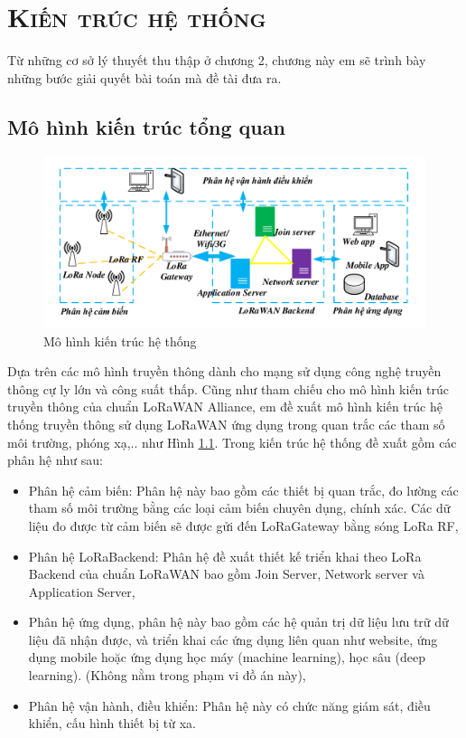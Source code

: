 \chapter{\textsc{Kiến trúc hệ thống}}
\label{chapter3}
Từ những cơ sở lý thuyết thu thập ở chương 2, chương này em sẽ trình bày những bước giải quyết bài toán mà đề tài đưa ra.
\section{Mô hình kiến trúc tổng quan}
		\begin{figure}[h!] %
			\centering
			\includegraphics[width=\linewidth]{./img/31.pdf}
			\caption{Mô hình kiến trúc hệ thống}
			\label{fig:fig31}
	\end{figure}
Dựa trên các mô hình truyền thông dành cho mạng sử dụng công nghệ truyền thông cự ly lớn và công suất thấp. Cũng như tham chiếu cho mô hình kiến trúc truyền thông của chuẩn LoRaWAN Alliance, em đề xuất mô hình kiến trúc hệ thống truyền thông sử dụng LoRaWAN ứng dụng trong quan trắc các tham số môi trường, phóng xạ,.. như Hình \ref{fig:fig31}. Trong kiến trúc hệ thống đề xuất gồm các phân hệ như sau:
\begin{itemize}
\item	Phân hệ cảm biến: Phân hệ này bao gồm các thiết bị quan trắc, đo lường các tham số môi trường bằng các loại cảm biến chuyên dụng, chính xác. Các dữ liệu đo được từ cảm biến sẽ được gửi đến LoRaGateway bằng sóng LoRa RF,
\item	Phân hệ LoRaBackend: Phân hệ đề xuất thiết kế triển khai theo LoRa Backend của chuẩn LoRaWAN bao gồm Join Server, Network server và Application Server,
\item	Phân hệ ứng dụng, phân hệ này bao gồm các hệ quản trị dữ liệu lưu trữ dữ liệu đã nhận được, và triển khai các ứng dụng liên quan như website, ứng dụng mobile hoặc ứng dụng học máy (machine learning), học sâu (deep learning). (Không nằm trong phạm vi đồ án này),
\item	Phân hệ vận hành, điều khiển: Phân hệ này có chức năng giám sát, điều khiển, cấu hình thiết bị từ xa. 
\end{itemize}

